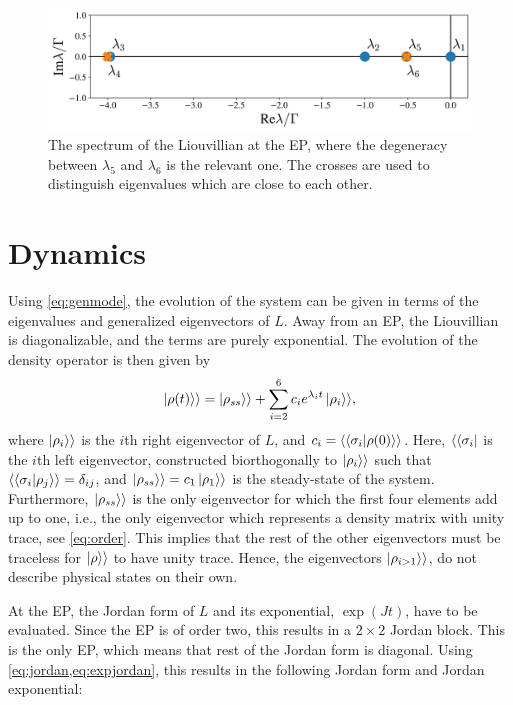 \documentclass[../main.tex]{subfiles}
\begin{document}
\begin{figure}[H]
    \centering
    \includegraphics[width=0.8\linewidth]{figures/spectrum.png}
    \caption{The spectrum of the Liouvillian at the EP, where the degeneracy between $\lambda_5$ and $\lambda_6$ is the relevant one. The crosses are used to distinguish eigenvalues which are close to each other.}
    \label{fig:spec}
\end{figure}

\section{Dynamics}

Using \cref{eq:genmode}, the evolution of the system can be given in terms of the eigenvalues and generalized eigenvectors of $L$. Away from an EP, the Liouvillian is diagonalizable, and the terms are purely exponential. The evolution of the density operator is then given by
\begin{equation}\label{eq:dynnonep}
    \ket{\rho(t)}\rangle = \ket{\rho_{ss}}\rangle + \sum_{i=2}^6 c_i e^{\lambda_i t} \ket{\rho_i}\rangle,
\end{equation}
where $\ket{\rho_i}\rangle$ is the $i$th right eigenvector of $L$, and $c_i = \langle\braket{\sigma_i|\rho(0)}\rangle$. Here, $\langle\bra{\sigma_i}$ is the $i$th left eigenvector, constructed biorthogonally to $\ket{\rho_i}\rangle$ such that $\langle\braket{\sigma_i|\rho_j}\rangle = \delta_{ij}$, and $\ket{\rho_{ss}}\rangle = c_1 \ket{\rho_1}\rangle$ is the steady-state of the system. Furthermore, $\ket{\rho_{ss}}\rangle$ is the only eigenvector for which the first four elements add up to one, i.e., the only eigenvector which represents a density matrix with unity trace, see \cref{eq:order}. This implies that the rest of the other eigenvectors must be traceless for $\ket{\rho}\rangle$ to have unity trace. Hence, the eigenvectors $\ket{\rho_{i>1}}\rangle$, do not describe physical states on their own.

At the EP, the Jordan form of $L$ and its exponential, $\exp{(Jt)}$, have to be evaluated. Since the EP is of order two, this results in a $2\times2$ Jordan block. This is the only EP, which means that rest of the Jordan form is diagonal. Using \cref{eq:jordan,eq:expjordan}, this results in the following Jordan form and Jordan exponential:
\end{document}
